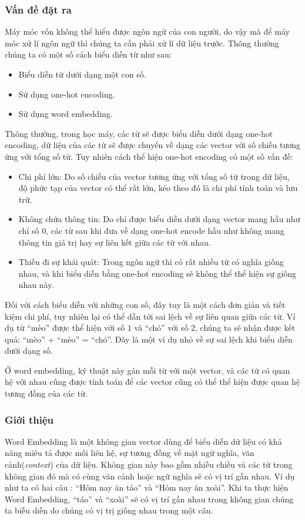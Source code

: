 \subsubsection{Vấn đề đặt ra}
Máy móc vốn không thể hiểu được ngôn ngữ của con người, do vậy mà để máy móc xử lí ngôn ngữ thì chúng ta cần phải xử lí dữ liệu trước. Thông thường chúng ta có một số cách biểu diễn từ như sau: \cite{webpage13}
\begin{itemize}
    \item Biểu diễn từ dưới dạng một con số.
    \item Sử dụng one-hot encoding.
    \item Sử dụng word embedding.
\end{itemize}

Thông thường, trong học máy, các từ sẽ được biểu diễn dưới dạng one-hot encoding, dữ liệu của các từ sẽ được chuyển về dạng các vector với số chiều tương ứng với tổng số từ. Tuy nhiên cách thể hiện one-hot encoding có một số vấn đề: \cite{webpage12}
\begin{itemize}
    \item Chi phí lớn: Do số chiều của vector tương ứng với tổng số từ trong dữ liệu, độ phức tạp của vector có thể rất lớn, kéo theo đó là chi phí tính toán và lưu trữ.
    \item Không chứa thông tin: Do chỉ được biểu diễn dưới dạng vector mang hầu như chỉ số $0$, các từ sau khi đưa về dạng one-hot encode hầu như không mang thông tin giá trị hay sự liên kết giữa các từ với nhau.
    \item Thiếu đi sự khái quát: Trong ngôn ngữ thì có rất nhiều từ có nghĩa giống nhau, và khi biểu diễn bằng one-hot encoding sẽ không thể thể hiện sự giống nhau này.
\end{itemize}

Đối với cách biểu diễn với những con số, đây tuy là một cách đơn giản và tiết kiệm chi phí, tuy nhiên lại có thể dẫn tới sai lệch về sự liên quan giữa các từ. Ví dụ từ ``mèo'' được thể hiện với số $1$ và ``chó'' với số $2$, chúng ta sẽ nhận được kết quả: ``mèo'' + ``mèo'' = ``chó''. Đây là một ví dụ nhỏ về sự sai lệch khi biểu diễn dưới dạng số. \cite{webpage13}

Ở word embedding, kỹ thuật này gán mỗi từ với một vector, và các từ có quan hệ với nhau cũng được tính toán để các vector cũng có thể thể hiện được quan hệ tương đồng của các từ.

\subsubsection{Giới thiệu}
Word Embedding là một không gian vector dùng để biểu diễn dữ liệu có khả năng miêu tả được mối liên hệ, sự tương đồng về mặt ngữ nghĩa, văn cảnh(\textit{context}) của dữ liệu. Không gian này bao gồm nhiều chiều và các từ trong không gian đó mà có cùng văn cảnh hoặc ngữ nghĩa sẽ có vị trí gần nhau. Ví dụ như ta có hai câu : ``Hôm nay ăn táo'' và ``Hôm nay ăn xoài''. Khi ta thực hiện Word Embedding, ``táo'' và ``xoài'' sẽ có vị trí gần nhau trong không gian chúng ta biễu diễn do chúng có vị trị giống nhau trong một câu. \cite{webpage12}

